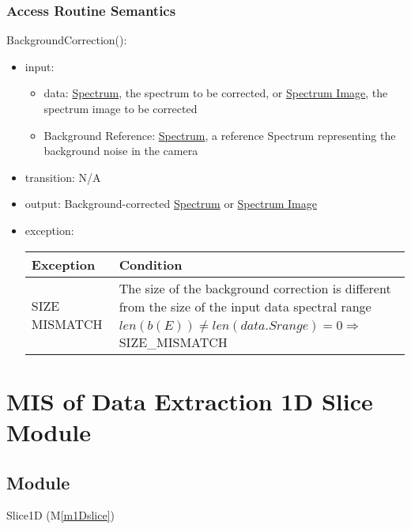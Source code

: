 \documentclass[12pt, titlepage]{article}
\newcommand{\mref}[1]{M\ref{#1}}
\begin{document}
\subsubsection{Access Routine Semantics}
\noindent BackgroundCorrection():
\begin{itemize}
    \item input: 
    \begin{itemize}
        \item data: \hyperref[Mod:Spectrum]{Spectrum}, the spectrum to be
        corrected, or \hyperref[Mod:SI]{Spectrum Image}, the spectrum image to be
        corrected
        \item Background Reference: \hyperref[Mod:Spectrum]{Spectrum}, a
        reference Spectrum representing the background noise in the camera
    \end{itemize}
    \item transition: N/A
    \item output: Background-corrected \hyperref[Mod:Spectrum]{Spectrum} or
    \hyperref[Mod:SI]{Spectrum Image}
    \item exception:
    \begin{center}
        \begin{tabular}{p{3.5cm} p{12cm}}
            \toprule[0.15em]
            \textbf{Exception} & \textbf{Condition}\\
            \midrule[0.1em]
            \multirow{2}{0.25\textwidth}{SIZE MISMATCH} & The size of the
            background correction is different from the size of the input data spectral
            range\\ 
            & $len(b(E)) \neq len(data.Srange) = 0 \Rightarrow$ SIZE\_MISMATCH\\
            
            \bottomrule[0.15em]
        \end{tabular}
    \end{center}
\end{itemize}


\section{MIS of Data Extraction 1D Slice Module} \label{Mod:Slice1D}

\subsection{Module}
Slice1D (\mref{m1Dslice})
\end{document}
